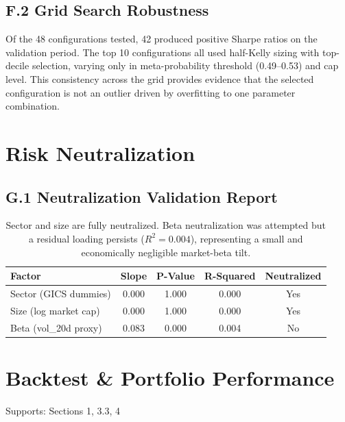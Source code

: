 \documentclass[11pt, a4paper]{article}
\begin{document}
\subsection*{F.2 Grid Search Robustness}
Of the 48 configurations tested, 42 produced positive Sharpe ratios on the validation period. The top 10 configurations all used half-Kelly sizing with top-decile selection, varying only in meta-probability threshold (0.49--0.53) and cap level. This consistency across the grid provides evidence that the selected configuration is not an outlier driven by overfitting to one parameter combination.

\section{Risk Neutralization}
\subsection*{G.1 Neutralization Validation Report}
\begin{table}[h]
\centering
\begin{tabular}{lcccc}
\toprule
\textbf{Factor} & \textbf{Slope} & \textbf{P-Value} & \textbf{R-Squared} & \textbf{Neutralized} \\
\midrule
Sector (GICS dummies) & 0.000 & 1.000 & 0.000 & Yes \\
Size (log market cap) & 0.000 & 1.000 & 0.000 & Yes \\
Beta (vol\_20d proxy) & 0.083 & 0.000 & 0.004 & No \\
\bottomrule
\end{tabular}
\caption{Sector and size are fully neutralized. Beta neutralization was attempted but a residual loading persists ($R^2 = 0.004$), representing a small and economically negligible market-beta tilt.}
\end{table}

\section{Backtest \& Portfolio Performance}
Supports: Sections 1, 3.3, 4
\end{document}
